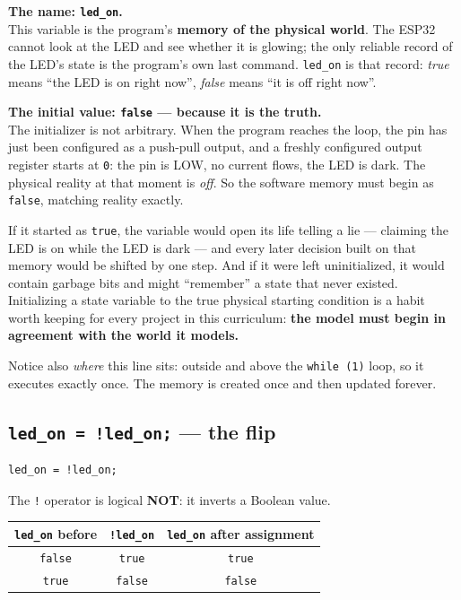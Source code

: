 \documentclass[11pt]{article}
\begin{document}
\textbf{The name: \texttt{led\_on}.} \\
This variable is the program's \textbf{memory of the physical world}. The ESP32 cannot look at the LED and see whether it is glowing; the only reliable record of the LED's state is the program's own last command. \texttt{led\_on} is that record: \emph{true} means ``the LED is on right now'', \emph{false} means ``it is off right now''.

\textbf{The initial value: \texttt{false} --- because it is the truth.} \\
The initializer is not arbitrary. When the program reaches the loop, the pin has just been configured as a push-pull output, and a freshly configured output register starts at \texttt{0}: the pin is LOW, no current flows, the LED is dark. The physical reality at that moment is \emph{off}. So the software memory must begin as \texttt{false}, matching reality exactly.

If it started as \texttt{true}, the variable would open its life telling a lie --- claiming the LED is on while the LED is dark --- and every later decision built on that memory would be shifted by one step. And if it were left uninitialized, it would contain garbage bits and might ``remember'' a state that never existed. Initializing a state variable to the true physical starting condition is a habit worth keeping for every project in this curriculum: \textbf{the model must begin in agreement with the world it models.}

Notice also \emph{where} this line sits: outside and above the \texttt{while (1)} loop, so it executes exactly once. The memory is created once and then updated forever.

\subsection{\texttt{led\_on = !led\_on;} --- the flip}

\begin{verbatim}
led_on = !led_on;
\end{verbatim}

The \texttt{!} operator is logical \textbf{NOT}: it inverts a Boolean value.

\begin{table}[htbp]
\centering
\renewcommand{\arraystretch}{1.3}
\begin{tabular}{@{}ccc@{}}
\toprule
\textbf{\texttt{led\_on} before} & \textbf{\texttt{!led\_on}} & \textbf{\texttt{led\_on} after assignment} \\
\midrule
\texttt{false} & \texttt{true} & \texttt{true} \\
\texttt{true} & \texttt{false} & \texttt{false} \\
\bottomrule
\end{tabular}
\end{table}
\end{document}
